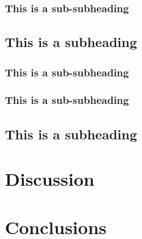 \documentclass[paper=a4,fontsize=11pt,twocolumn]{article}
\begin{document}
\lipsum[12]
\subsubsection{This is a sub-subheading}
\lipsum[13]

\subsection{This is a subheading}
\subsubsection{This is a sub-subheading}
\lipsum[14]
\subsubsection{This is a sub-subheading}
\lipsum[15]

\subsection{This is a subheading}
\lipsum[16-18]

\section{Discussion}
\lipsum[19-23]

\section{Conclusions}
\lipsum[24-32]


\end{document}
